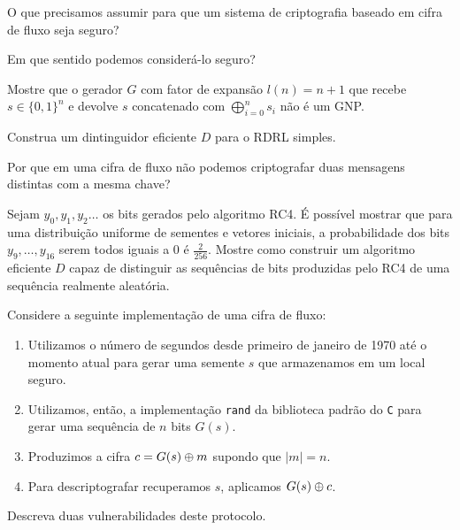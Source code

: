 \begin{exercicio}
  O que precisamos assumir para que um sistema de criptografia baseado em cifra de fluxo seja seguro?

  Em que sentido podemos considerá-lo seguro?
\end{exercicio}

\begin{exercicio}
Mostre que o gerador $G$ com fator de expansão $l(n) = n + 1$ que recebe $s \in \{0,1\}^n$ e devolve $s$ concatenado com $\bigoplus_{i=0}^ns_i$ não é um GNP.  
\end{exercicio}

\begin{exercicio}
  Construa um dintinguidor eficiente $D$ para o RDRL simples.
\end{exercicio}

\begin{exercicio}
  Por que em uma cifra de fluxo não podemos criptografar duas mensagens distintas com a mesma chave?
\end{exercicio}

\begin{exercicio}
 Sejam $y_0, y_1, y_2 \dots$ os bits gerados pelo algoritmo RC4.
É possível mostrar que para uma distribuição uniforme de sementes e vetores iniciais, a probabilidade dos bits $y_9, \dots, y_{16}$ serem todos iguais a $0$ é $\frac{2}{256}$.
Mostre como construir um algoritmo eficiente $D$ capaz de distinguir as sequências de bits produzidas pelo RC4 de uma sequência realmente aleatória.
\end{exercicio}

\begin{exercicio}
  Considere a seguinte implementação de uma cifra de fluxo:
\begin{enumerate}
\item Utilizamos o número de segundos desde primeiro de janeiro de 1970 até o momento atual para gerar uma semente $s$ que armazenamos em um local seguro.
\item Utilizamos, então, a implementação {\tt rand} da biblioteca padrão do {\tt C} para gerar uma sequência de $n$ bits $G(s)$.
\item Produzimos a cifra $c = G(s) \oplus m$ supondo que $|m| = n$.
\item Para descriptografar recuperamos $s$, aplicamos $G(s) \oplus c$.
\end{enumerate}

  Descreva duas vulnerabilidades deste protocolo.
\end{exercicio}


